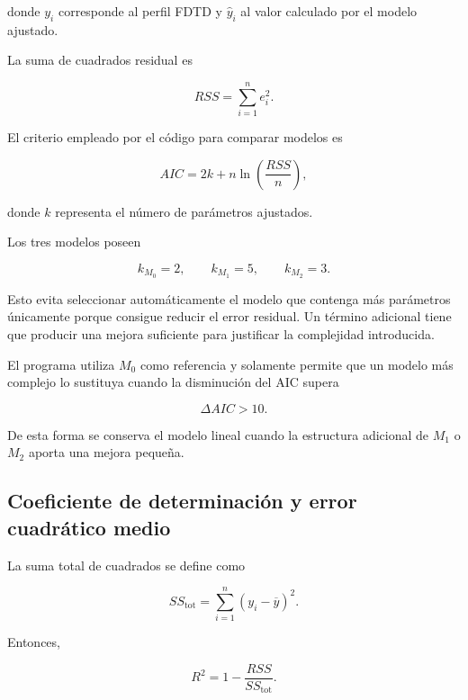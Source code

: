 donde $y_i$ corresponde al perfil FDTD y $\widehat{y}_i$ al valor calculado por el modelo ajustado.

La suma de cuadrados residual es

\begin{equation}
RSS
=
\sum_{i=1}^{n}e_i^2.
\end{equation}

El criterio empleado por el código para comparar modelos es

\begin{equation}
AIC
=
2k
+
n\ln
\left(
\frac{RSS}{n}
\right),
\label{eq:AIC}
\end{equation}

donde $k$ representa el número de parámetros ajustados.

Los tres modelos poseen

\begin{equation}
k_{M_0}=2,
\qquad
k_{M_1}=5,
\qquad
k_{M_2}=3.
\end{equation}

Esto evita seleccionar automáticamente el modelo que contenga más parámetros únicamente porque consigue reducir el error residual. Un término adicional tiene que producir una mejora suficiente para justificar la complejidad introducida.

El programa utiliza $M_0$ como referencia y solamente permite que un modelo más complejo lo sustituya cuando la disminución del AIC supera

\begin{equation}
\Delta AIC>10.
\end{equation}

De esta forma se conserva el modelo lineal cuando la estructura adicional de $M_1$ o $M_2$ aporta una mejora pequeña.

\subsection{Coeficiente de determinación y error cuadrático medio}

La suma total de cuadrados se define como

\begin{equation}
SS_{\mathrm{tot}}
=
\sum_{i=1}^{n}
(y_i-\overline{y})^2.
\end{equation}

Entonces,

\begin{equation}
R^2
=
1-
\frac{RSS}{SS_{\mathrm{tot}}}.
\label{eq:R2}
\end{equation}

